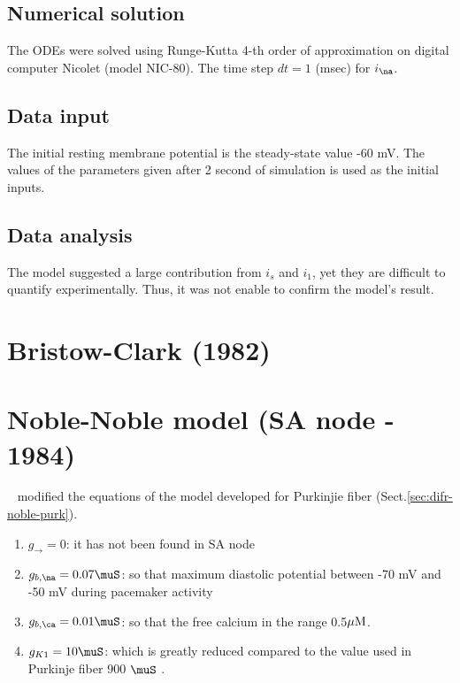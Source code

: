\subsection{Numerical solution}

The ODEs were solved using Runge-Kutta 4-th order of approximation on digital
computer Nicolet (model NIC-80). The time step $dt=1$ (msec) for $i_\na$.

\subsection{Data input}

The initial resting membrane potential is the steady-state value -60 mV. The
values of the parameters given after 2 second of simulation is used as the
initial inputs.


\subsection{Data analysis}

The model suggested a large contribution from $i_s $ and $i_1$, yet they are
difficult to quantify experimentally. Thus, it was not enable to confirm the
model's result.

\section{Bristow-Clark (1982)}
\label{sec:SA_node_Bristow1982}

\citep{bristow1982mmp}

\section{Noble-Noble model (SA node - 1984)}
\label{sec:SA_node_Noble1984}

~\citep{noble1984msa} modified the equations of the model developed for
Purkinjie fiber (Sect.\ref{sec:difr-noble-purk}). 
\begin{enumerate}
  \item $g_\to = 0$: it has not been found in SA node
  \item $g_{b,\na} = 0.07 \muS$: so that maximum diastolic potential
  between -70 mV and -50 mV during pacemaker activity
  \item $g_{b, \ca} = 0.01 \muS$:  so that the free calcium in the range
  0.5${\mu\text{M}}$.
  \item $g_{K1} = 10 \muS$: which is greatly reduced compared to the value used
  in Purkinje fiber 900 $\muS$ \citep{difrancesco1985mcea}.
\end{enumerate}

